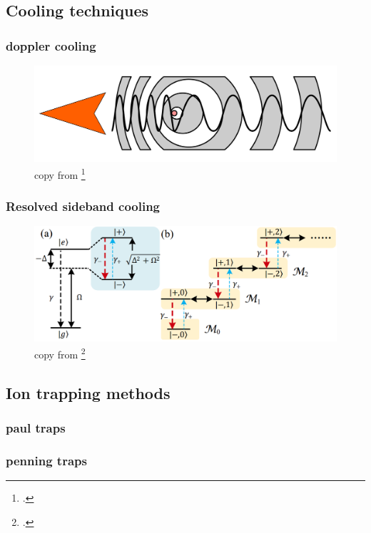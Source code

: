 \documentclass[18 pt]{beamer}
\begin{document}
\subsection{Cooling techniques}
\begin{frame}
  \frametitle{doppler cooling}
  \begin{figure}
    \includegraphics[width=.8\textwidth]{1920px-Doppler_effect_diagrammatic.svg.png}
    \caption{copy from \footcite{https://en.wikipedia.org/wiki/Doppler_cooling}}
  \end{figure}
\end{frame}
\begin{frame}
  \frametitle{Resolved sideband cooling}
  \begin{figure}
    \includegraphics[width= .4\textwidth]{sideband.png}
    \caption{copy from \footcite{https://arxiv.org/pdf/2211.08896.pdf}}
  \end{figure}
\end{frame}

\subsection{Ion trapping methods}
\begin{frame}
  \frametitle{paul traps}
\end{frame}
\begin{frame}
  \frametitle{penning traps}
\end{frame}
\end{document}
